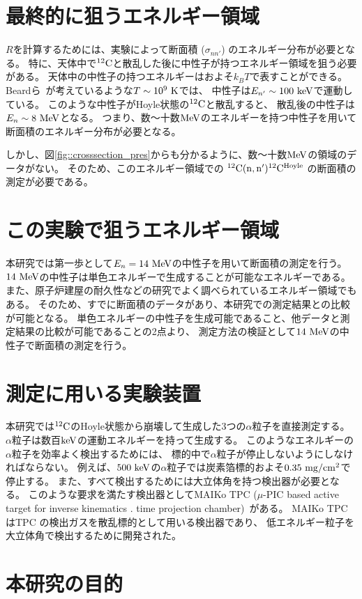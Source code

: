 \section{最終的に狙うエネルギー領域}
$R$を計算するためには、実験によって断面積 ($\sigma_{nn'}$) のエネルギー分布が必要となる。
特に、天体中で${}^{12}\rm{C}$と散乱した後に中性子が持つエネルギー領域を狙う必要がある。
天体中の中性子の持つエネルギーはおよそ$k_{B}T$で表すことができる。
Beardら~\cite{hotdensemedium}が考えているような$T\sim10^{9}~\rm{K}$では、
中性子は$E_{n'}\sim100~\rm{keV}$で運動している。
このような中性子がHoyle状態の${}^{12}\rm{C}$と散乱すると、
散乱後の中性子は$E_{n}\sim8~\rm{MeV}$となる。
つまり、数〜十数$\rm{MeV}$のエネルギーを持つ中性子を用いて断面積のエネルギー分布が必要となる。

しかし、図\ref{fig::crosssection_pres}からも分かるように、数〜十数$\rm{MeV}$の領域のデータがない。
そのため、このエネルギー領域での ${}^{12}\rm{C}(n,n'){}^{12}\rm{C}^{Hoyle}$ の断面積の測定が必要である。

\section{この実験で狙うエネルギー領域}
本研究では第一歩として$E_{n} = 14~\rm{MeV}$の中性子を用いて断面積の測定を行う。
$14~\rm{MeV}$の中性子は単色エネルギーで生成することが可能なエネルギーである。
また、原子炉建屋の耐久性などの研究でよく調べられているエネルギー領域でもある。
そのため、すでに断面積のデータがあり、本研究での測定結果との比較が可能となる。
単色エネルギーの中性子を生成可能であること、他データと測定結果の比較が可能であることの2点より、
測定方法の検証として$14~\rm{MeV}$の中性子で断面積の測定を行う。

\section{測定に用いる実験装置}
本研究では${}^{12}\rm{C}$のHoyle状態から崩壊して生成した3つの$\alpha$粒子を直接測定する。
$\alpha$粒子は数百$\rm{keV}$の運動エネルギーを持って生成する。
このようなエネルギーの$\alpha$粒子を効率よく検出するためには、
標的中で$\alpha$粒子が停止しないようにしなければならない。
例えば、$500~\rm{keV}$の$\alpha$粒子では炭素箔標的およそ$0.35~\rm{mg/cm^2}$で停止する。
また、すべて検出するためには大立体角を持つ検出器が必要となる。%
このような要求を満たす検出器としてMAIKo TPC ($\mu$-PIC based active target for inverse kinematics .
time projection chamber)~\cite{maiko, mupic}がある。
MAIKo TPC はTPC の検出ガスを散乱標的として用いる検出器であり、
低エネルギー粒子を大立体角で検出するために開発された。

\section{本研究の目的}
\label{thiswork}
